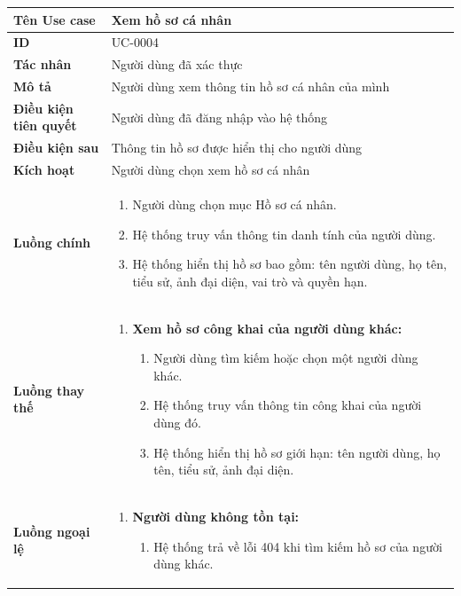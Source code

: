 {
\renewcommand{\arraystretch}{1.5}

\begin{tabularx}{\textwidth}{|>{\raggedright\arraybackslash}X|>{\raggedright\arraybackslash}X|}
\hline
\textbf{Tên Use case} & Xem hồ sơ cá nhân \\
\hline
\textbf{ID} & UC-0004 \\
\hline
\textbf{Tác nhân} & Người dùng đã xác thực \\
\hline
\textbf{Mô tả} & Người dùng xem thông tin hồ sơ cá nhân của mình \\
\hline
\textbf{Điều kiện tiên quyết} & Người dùng đã đăng nhập vào hệ thống \\
\hline
\textbf{Điều kiện sau} & Thông tin hồ sơ được hiển thị cho người dùng \\
\hline
\textbf{Kích hoạt} & Người dùng chọn xem hồ sơ cá nhân \\
\hline
\textbf{Luồng chính} &
\begin{enumerate}
    \item Người dùng chọn mục Hồ sơ cá nhân.
    \item Hệ thống truy vấn thông tin danh tính của người dùng.
    \item Hệ thống hiển thị hồ sơ bao gồm: tên người dùng, họ tên, tiểu sử, ảnh đại diện, vai trò và quyền hạn.
\end{enumerate} \\
\hline
\textbf{Luồng thay thế} &
\begin{enumerate}
    \item \textbf{Xem hồ sơ công khai của người dùng khác:}
    \begin{enumerate}
        \item[1A.] Người dùng tìm kiếm hoặc chọn một người dùng khác.
        \item[2A.] Hệ thống truy vấn thông tin công khai của người dùng đó.
        \item[3A.] Hệ thống hiển thị hồ sơ giới hạn: tên người dùng, họ tên, tiểu sử, ảnh đại diện.
    \end{enumerate}
\end{enumerate} \\
\hline
\textbf{Luồng ngoại lệ} &
\begin{enumerate}
    \item \textbf{Người dùng không tồn tại:}
    \begin{enumerate}
        \item[2AErr.] Hệ thống trả về lỗi 404 khi tìm kiếm hồ sơ của người dùng khác.
    \end{enumerate}
\end{enumerate} \\
\hline
\end{tabularx}
}
